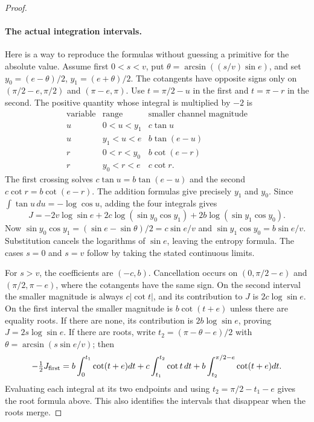 \begin{proof}
\paragraph{The actual integration intervals.}
Here is a way to reproduce the formulas without guessing a primitive
for the absolute value. Assume first $0<s<v$, put
$\theta=\arcsin((s/v)\sin e)$, and set
$y_0=(e-\theta)/2$, $y_1=(e+\theta)/2$. The cotangents have
opposite signs only on $(\pi/2-e,\pi/2)$ and $(\pi-e,\pi)$.
Use $t=\pi/2-u$ in the first and $t=\pi-r$ in the second.
The positive quantity whose integral is multiplied by $-2$ is
\[
\begin{array}{ccc}
 \text{variable}&\text{range}&\text{smaller channel magnitude}\\ \hline
 u&0<u<y_1&c\tan u\\
 u&y_1<u<e&b\tan(e-u)\\
 r&0<r<y_0&b\cot(e-r)\\
 r&y_0<r<e&c\cot r.
\end{array}
\]
The first crossing solves $c\tan u=b\tan(e-u)$ and the second
$c\cot r=b\cot(e-r)$. The addition formulas give precisely $y_1$
and $y_0$. Since $\int\tan u\,du=-\log\cos u$, adding the four
integrals gives
\[
 J=-2v\log\sin e+
 2c\log(\sin y_0\cos y_1)+2b\log(\sin y_1\cos y_0).
\]
Now
$\sin y_0\cos y_1=(\sin e-\sin\theta)/2=c\sin e/v$ and
$\sin y_1\cos y_0=b\sin e/v$. Substitution cancels the logarithms
of $\sin e$, leaving the entropy formula. The cases $s=0$ and $s=v$
follow by taking the stated continuous limits.

For $s>v$, the coefficients are $(-c,b)$. Cancellation occurs on
$(0,\pi/2-e)$ and $(\pi/2,\pi-e)$, where the cotangents have the
same sign. On the second interval the smaller magnitude is always
$c|\cot t|$, and its contribution to $J$ is $2c\log\sin e$.
On the first interval the smaller magnitude is $b\cot(t+e)$ unless
there are equality roots. If there are none, its contribution is
$2b\log\sin e$, proving $J=2s\log\sin e$. If there are roots,
write $t_2=(\pi-\theta-e)/2$ with
$\theta=\arcsin(s\sin e/v)$; then
\[
 -\tfrac12 J_{\rm first}
 =b\int_0^{t_1}\cot(t+e)dt
  +c\int_{t_1}^{t_2}\cot t\,dt
  +b\int_{t_2}^{\pi/2-e}\cot(t+e)dt.
\]
Evaluating each integral at its two endpoints and using
$t_2=\pi/2-t_1-e$ gives the root formula above. This also identifies
the intervals that disappear when the roots merge.


\end{proof}
